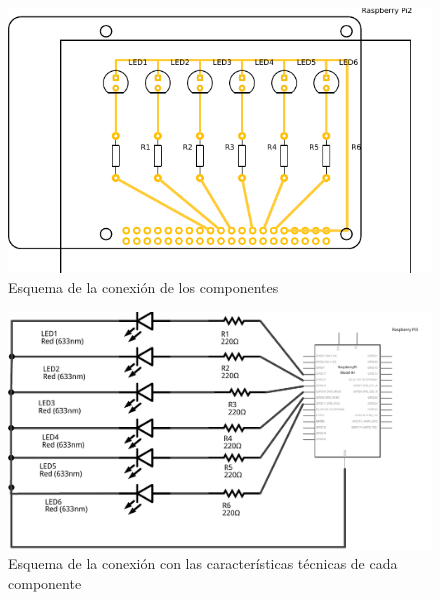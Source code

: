 \documentclass{article}
\begin{document}
\begin{figure}[H]
\centering
\includegraphics[height=0.3\textheight]{placafinal_pcb}
\caption{Esquema de la conexión de los componentes}
\end{figure}

\begin{figure}[H]
\centering
\includegraphics[height=0.3\textheight]{placafinalschematic_schem}
\caption{Esquema de la conexión con las características técnicas de cada componente}
\end{figure}


\end{document}
